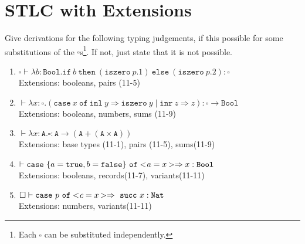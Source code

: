 \section{STLC with Extensions}

Give derivations for the following typing judgements,
if this possible for some substitutions of the $\square$s\footnote{Each $\square$ can be substituted independently.}.
If not, just state that it is not possible.\\
\begin{enumerate}
  \item $\square\vdash \lambda{b:\mathtt{Bool}}. \mathtt{if}\ b\ \mathtt{then}\ (\mathtt{iszero}\ p.1)\ \mathtt{else}\ (\mathtt{iszero}\ p.2) : \square$ 
    \\ Extensions: booleans, pairs (11-5)
  \item $\vdash \lambda{x:\square}. (\mathtt{case}\ x\ \mathtt{of}\ \mathtt{inl}\ y\Rightarrow{\mathtt{iszero}\ y}\mid\mathtt{inr}\ z\Rightarrow{z}) : \square\to\mathtt{Bool}$ \\
    Extensions: booleans, numbers, sums (11-9) 
  \item   $\vdash \lambda{x:\mathtt{A}}. \square : \mathtt{A} \to (\mathtt{A}+(\mathtt{A}\times\mathtt{A})) $\\
    Extensions: base types (11-1), pairs (11-5), sums(11-9) 
  \item $\vdash \mathtt{case}\ \{a=\mathtt{true}, b=\mathtt{false}\}\ \mathtt{of}<\hspace{-0.2em}a=x\hspace*{-0.1em}>\Rightarrow x : \mathtt{Bool} $\\
    Extensions: booleans, records(11-7), variants(11-11)
  \item   $\square \vdash \mathtt{case}\ p\ \mathtt{of}<\hspace{-0.2em}c=x\hspace{-0.1em}>\Rightarrow\ \mathtt{succ}\ x : \mathtt{Nat} $ \\
    Extensions: numbers, variants(11-11) 
\end{enumerate}

